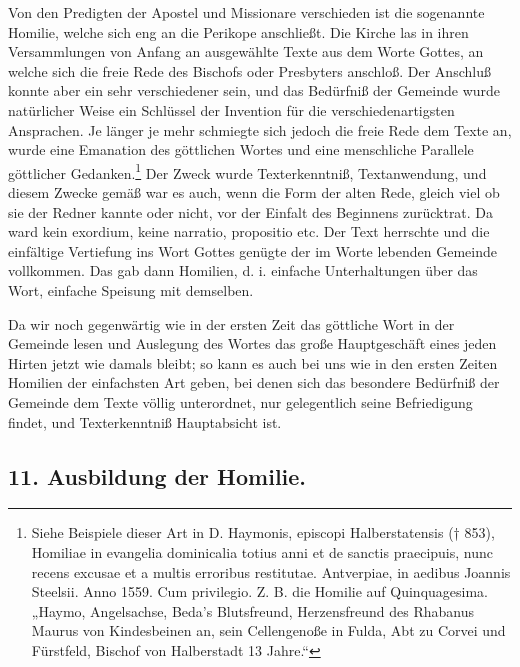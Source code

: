 Von den Predigten der Apostel und Missionare verschieden ist die sogenannte Homilie, welche sich eng an die Perikope anschließt. Die Kirche las in ihren Versammlungen von Anfang an ausgewählte Texte aus dem Worte Gottes, an welche sich die freie Rede des Bischofs oder Presbyters anschloß. Der Anschluß konnte aber ein sehr verschiedener sein, und das Bedürfniß der Gemeinde wurde natürlicher Weise ein Schlüssel der Invention für die verschiedenartigsten Ansprachen. Je länger je mehr schmiegte sich jedoch die freie Rede dem Texte an, wurde eine Emanation des göttlichen Wortes und eine menschliche Parallele göttlicher Gedanken.\footnote{Siehe Beispiele dieser Art in D. Haymonis, episcopi Halberstatensis († 853), Homiliae in evangelia dominicalia totius anni et de sanctis praecipuis, nunc recens excusae et a multis erroribus restitutae. Antverpiae, in aedibus Joannis Steelsii. Anno 1559. Cum privilegio. Z. B. die Homilie auf Quinquagesima. „Haymo, Angelsachse, Beda’s Blutsfreund, Herzensfreund des Rhabanus Maurus von Kindesbeinen an, sein Cellengenoße in Fulda, Abt zu Corvei und Fürstfeld, Bischof von Halberstadt 13 Jahre.“} Der Zweck wurde Texterkenntniß, Textanwendung, und diesem Zwecke gemäß war es auch, wenn die Form der alten Rede, gleich viel ob sie der Redner kannte oder nicht, vor der Einfalt des Beginnens zurücktrat. Da ward kein exordium,
keine narratio, propositio etc. Der Text herrschte und die einfältige Vertiefung ins Wort Gottes genügte der im Worte lebenden Gemeinde vollkommen. Das gab dann Homilien, d. i. einfache Unterhaltungen über das Wort, einfache Speisung mit demselben.

Da wir noch gegenwärtig wie in der ersten Zeit das göttliche Wort in der Gemeinde lesen und Auslegung des Wortes das große Hauptgeschäft eines jeden Hirten jetzt wie damals bleibt; so kann es auch bei uns wie in den ersten Zeiten Homilien der einfachsten Art geben, bei denen sich das besondere Bedürfniß der Gemeinde dem Texte völlig unterordnet, nur gelegentlich seine Befriedigung findet, und Texterkenntniß Hauptabsicht ist.

\subsection*{11. Ausbildung der Homilie.}

